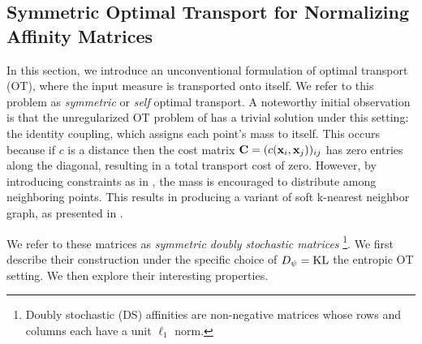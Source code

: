 \subsection{Symmetric Optimal Transport for Normalizing Affinity Matrices}\label{sec:doubly_sto}

In this section, we introduce an unconventional formulation of optimal transport (OT), where the input measure is transported onto itself. We refer to this problem as \emph{symmetric} or \emph{self} optimal transport. A noteworthy initial observation is that the unregularized OT problem of  has a trivial solution under this setting: the identity coupling, which assigns each point's mass to itself. This occurs because if $c$ is a distance then the cost matrix $\mathbf{C} = (c({\mathbf{x}}_i, {\mathbf{x}}_j))_{ij}$ has zero entries along the diagonal, resulting in a total transport cost of zero. However, by introducing constraints as in , the mass is encouraged to distribute among neighboring points. This results in producing a variant of soft k-nearest neighbor graph, as presented in .

We refer to these matrices as \emph{symmetric doubly stochastic matrices} \footnote{Doubly stochastic (DS) affinities are non-negative matrices whose rows and columns each have a unit $\ell_1$ norm.}. We first describe their construction under the specific choice of $D_\psi = \operatorname{KL}$ \ie the entropic OT setting. We then explore their interesting properties.

